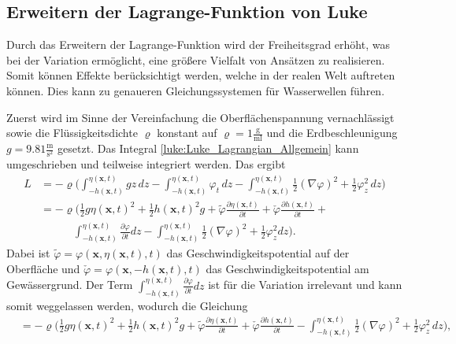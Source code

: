 \subsection{Erweitern der Lagrange-Funktion von Luke
	\label{luke:subsection:Erweitern}}

Durch das Erweitern der Lagrange-Funktion wird der Freiheitsgrad erhöht, was bei der Variation ermöglicht, eine größere Vielfalt von Ansätzen zu realisieren.
Somit können Effekte berücksichtigt werden, welche in der realen Welt auftreten können. Dies kann zu genaueren Gleichungssystemen für Wasserwellen führen.

Zuerst wird im Sinne der Vereinfachung die Oberflächenspannung vernachlässigt sowie die Flüssigkeitsdichte $\varrho$ konstant auf $\varrho = 1\frac{\text{g}}{\text{ml}}$ und die Erdbeschleunigung $g = 9.81\frac{\text{m}}{\text{s}^2}$ gesetzt.
Das Integral \eqref{luke:Luke_Lagrangian_Allgemein} kann umgeschrieben und teilweise integriert werden. 
Das ergibt
\begin{align*}
	L
	&=
	-\varrho\biggl(
\int_{-h(\bm{x},t)}^{\eta(\bm{x},t)} g z\, dz
-
\int_{-h(\bm{x},t)}^{\eta(\bm{x},t)} \varphi_t\, dz
-
\int_{-h(\bm{x},t)}^{\eta(\bm{x},t)}
\frac{1}{2}(\nabla\varphi)^2
+ \frac{1}{2}\varphi_z^2\, dz
\biggr)
\\
&=
-\varrho\biggl(\frac{1}{2}g\eta(\bm{x},t)^2 + \frac{1}{2}h(\bm{x},t)^2g +\tilde{\varphi} \frac{\partial\eta(\bm{x},t)}{\partial t} + \check{\varphi} \frac{\partial h(\bm{x},t)}{\partial t} + \\ &\qquad\quad\int_{-h(\bm{x},t)}^{\eta(\bm{x},t)} \frac{\partial \varphi}{\partial t}dz
-\int_{-h(\bm{x},t)}^{\eta(\bm{x},t)}
\frac{1}{2}(\nabla\varphi)^2 + \frac{1}{2}\varphi_z^2 dz\biggr).
\end{align*}
Dabei ist $\tilde{\varphi} = \varphi(\bm{x},\eta(\bm{x},t),t)$ das Geschwindigkeitspotential auf der Oberfläche und $\check{\varphi} = \varphi(\bm{x},-h(\bm{x},t),t)$ das Geschwindigkeitspotential am Gewässergrund.
Der Term $\int_{-h(\bm{x},t)}^{\eta(\bm{x},t)} \frac{\partial \varphi}{\partial t}dz$ ist für die Variation irrelevant und kann somit weggelassen werden, wodurch die Gleichung
\begin{align*}
	&=
-\varrho\biggl(\frac{1}{2}g\eta(\bm{x},t)^2
+
\frac{1}{2}h(\bm{x},t)^2g
+\tilde{\varphi} \frac{\partial\eta(\bm{x},t)}{\partial t}
+
\check{\varphi} \frac{\partial h(\bm{x},t)}{\partial t}
-
\int_{-h(\bm{x},t)}^{\eta(\bm{x},t)}
\frac{1}{2}(\nabla\varphi)^2
+
\frac{1}{2}\varphi_z^2\, dz\biggr),
\end{align*}
